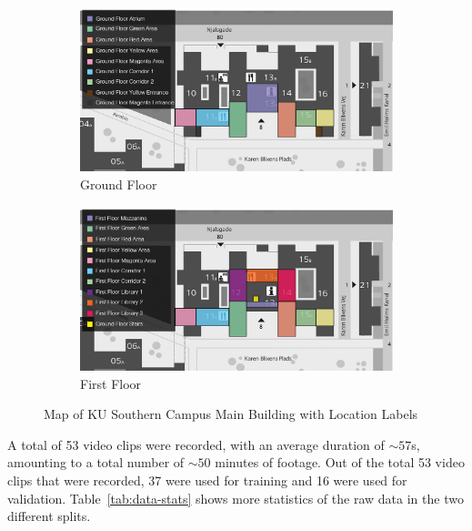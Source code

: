 \documentclass[a4paper]{article}
\begin{document}
  \begin{figure}[ht]
    \centering
    \begin{subfigure}[b]{.9\linewidth}
      \centering
      \includegraphics[width=\linewidth]{figures/map-ground-floor.jpg}
      \caption{Ground Floor}
      \label{fig:map-ground-floor}
    \end{subfigure}
    \hfill
    \begin{subfigure}[b]{0.9\linewidth}
      \centering
      \includegraphics[width=\linewidth]{figures/map-first-floor.jpg}
      \caption{First Floor}
      \label{fig:map-first-floor}
    \end{subfigure}
    \caption{Map of KU Southern Campus Main Building with Location Labels}
    \label{fig:map}
  \end{figure}

  
  A total of 53 video clips were recorded, with an average duration of $\sim 57$s,
  amounting to a total number of $\sim 50$ minutes of footage. Out of the total
  53 video clips that were recorded, 37 were used for training and 16 were used
  for validation. Table~\ref{tab:data-stats} shows more statistics of the raw
  data in the two different splits.
\end{document}
